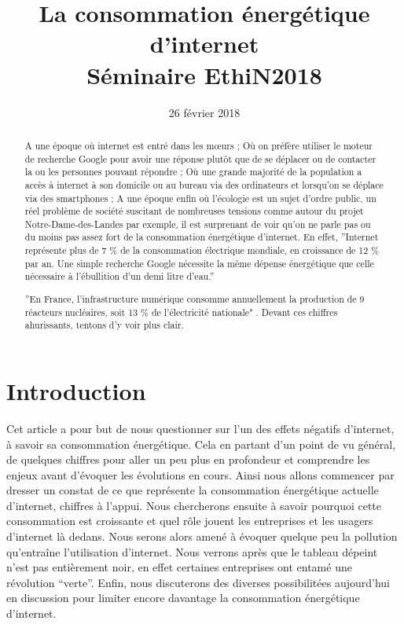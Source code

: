 \documentclass[a4paper,twocolumn,12pt]{article}
\title{\Huge \bfseries La consommation énergétique d'internet \\ \vspace{0.2cm}  \normalsize Séminaire EthiN2018}
\date{\small{26 février 2018}}
\begin{document}
\maketitle 

\begin{abstract}

A une époque où internet est entré dans les mœurs ; Où on préfère utiliser le moteur de recherche Google pour avoir une réponse plutôt que de se déplacer ou de contacter la ou les personnes pouvant répondre ; Où une grande majorité de la population a accès à internet à son domicile ou au bureau via des ordinateurs et lorsqu'on se déplace via des smartphones ; A une époque enfin où l'écologie est un sujet d'ordre public, un réel problème de société suscitant de nombreuses tensions comme autour du projet Notre-Dame-des-Landes par exemple, il est surprenant de voir qu'on ne parle pas ou du moins pas assez fort de la consommation énergétique d'internet. En effet, ''Internet représente plus de 7 \% de la consommation électrique mondiale, en croissance de 12 \% par an. Une simple recherche Google nécessite la même dépense énergétique que celle nécessaire à l’ébullition d’un demi litre d’eau.''

\newpage

	''En France, l’infrastructure numérique consomme annuellement la production de 9 réacteurs nucléaires, soit 13 \% de l’électricité nationale" \cite{1}. Devant ces chiffres ahurissants, tentons d'y voir plus clair.

\end{abstract}

\tableofcontents

\newpage

\section{Introduction}

	Cet article a pour but de nous questionner sur l’un des effets négatifs d’internet, à savoir sa consommation énergétique. Cela en partant d’un point de vu général, de quelques chiffres pour aller un peu plus en profondeur et comprendre les enjeux avant d’évoquer les évolutions en cours. Ainsi nous allons commencer par dresser un constat de ce que représente la consommation énergétique actuelle d’internet, chiffres à l’appui. Nous chercherons ensuite à savoir pourquoi cette consommation est croissante et quel rôle jouent les entreprises et les usagers d’internet là dedans. Nous serons alors amené à évoquer quelque peu la pollution qu’entraîne l’utilisation d’internet. Nous verrons après que le tableau dépeint n’est pas entièrement noir, en effet certaines entreprises ont entamé une révolution “verte”. Enfin, nous discuterons des diverses possibilitées aujourd’hui en discussion pour limiter encore davantage la consommation énergétique d’internet.  \\
	
\end{document}
